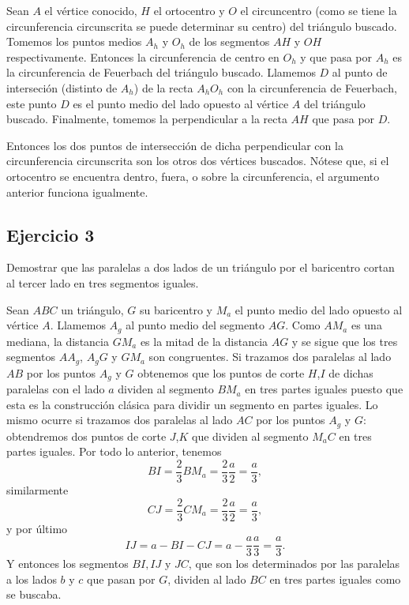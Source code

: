 \begin{sol}
	Sean $A$ el vértice conocido, $H$ el ortocentro y $O$ el circuncentro (como se tiene la circunferencia circunscrita se puede determinar su centro) del triángulo buscado. Tomemos los puntos medios $A_h$ y $O_h$ de los segmentos $AH$ y $OH$ respectivamente. Entonces la circunferencia de centro en $O_h$ y que pasa por $A_h$ es la circunferencia de Feuerbach del triángulo buscado. Llamemos $D$ al punto de interseción (distinto de $A_h$) de la recta $A_hO_h$ con la circunferencia de Feuerbach, este punto $D$ es el punto medio del lado opuesto al vértice $A$ del triángulo buscado. Finalmente, tomemos la perpendicular a la recta $AH$ que pasa por $D$. 
	
	Entonces los dos puntos de intersección de dicha perpendicular con la circunferencia circunscrita son los otros dos vértices buscados. Nótese que, si el ortocentro se encuentra dentro, fuera, o sobre la circunferencia, el argumento anterior funciona igualmente.
\end{sol}
\begin{center}

\end{center}

\subsection*{Ejercicio 3}
Demostrar que las paralelas a dos lados de un triángulo por el baricentro
cortan al tercer lado en tres segmentos iguales.

\begin{sol}
	Sean $ABC$ un triángulo, $G$ su baricentro y $M_a$ el punto medio del lado opuesto al vértice $A$. Llamemos $A_g$ al punto medio del segmento $AG$. Como $AM_a$ es una mediana, la distancia $GM_a$ es la mitad de la distancia $AG$ y se sigue que los tres segmentos $AA_g$, $A_gG$ y $GM_a$ son congruentes. Si trazamos dos paralelas al lado $AB$ por los puntos $A_g$ y $G$ obtenemos que los puntos de corte $H$,$I$ de dichas paralelas con el lado $a$ dividen al segmento $BM_a$ en tres partes iguales puesto que esta es la construcción clásica para dividir un segmento en partes iguales. Lo mismo ocurre si trazamos dos paralelas al lado $AC$ por los puntos $A_g$ y $G$: obtendremos dos puntos de corte $J$,$K$ que dividen al segmento $M_aC$ en tres partes iguales. Por todo lo anterior, tenemos 
	\[ BI = \frac{2}{3} BM_a = \frac{2}{3} \frac{a}{2} = \frac{a}{3}, \]
	similarmente
	\[ CJ = \frac{2}{3} CM_a = \frac{2}{3} \frac{a}{2} = \frac{a}{3}, \]
	y por último
	\[ IJ = a-BI-CJ = a-\frac{a}{3}\frac{a}{3} = \frac{a}{3}. \]
	Y entonces los segmentos $BI,IJ$ y $JC$, que son los determinados por las paralelas a los lados $b$ y $c$ que pasan por $G$, dividen al lado $BC$ en tres partes iguales como se buscaba.
\end{sol}
